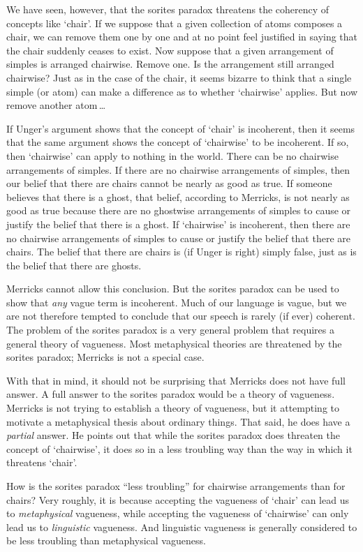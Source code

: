 \documentclass[11pt]{article}
\begin{document}
\begin{spacing}{1.5}
We have seen, however, that the sorites paradox threatens the
coherency of concepts like `chair'.  If we suppose that a given
collection of atoms composes a chair, we can remove them one by one
and at no point feel justified in saying that the chair suddenly
ceases to exist.  Now suppose that a given arrangement of simples is
arranged chairwise.  Remove one.  Is the arrangement still arranged
chairwise?  Just as in the case of the chair, it seems bizarre to
think that a single simple (or atom) can make a difference as to
whether `chairwise' applies.  But now remove another atom\,\ldots

If Unger's argument shows that the concept of `chair' is incoherent,
then it seems that the same argument shows the concept of `chairwise'
to be incoherent.  If so, then `chairwise' can apply to nothing in the
world.  There can be no chairwise arrangements of simples.  If there
are no chairwise arrangements of simples, then our belief that there
are chairs cannot be nearly as good as true.  If someone believes that
there is a ghost, that belief, according to Merricks, is not nearly as
good as true because there are no ghostwise arrangements of simples to
cause or justify the belief that there is a ghost.  If `chairwise' is
incoherent, then there are no chairwise arrangements of simples to
cause or justify the belief that there are chairs.  The belief that
there are chairs is (if Unger is right) simply false, just as is the
belief that there are ghosts.

Merricks cannot allow this conclusion.  But the sorites paradox can be
used to show that {\em any} vague term is incoherent.  Much of our
language is vague, but we are not therefore tempted to conclude that
our speech is rarely (if ever) coherent.  The problem of the sorites
paradox is a very general problem that requires a general theory of
vagueness.  Most metaphysical theories are threatened by the sorites
paradox; Merricks is not a special case.

With that in mind, it should not be surprising that Merricks does not
have full answer.  A full answer to the sorites paradox would be a
theory of vagueness.  Merricks is not trying to establish a theory of
vagueness, but it attempting to motivate a metaphysical thesis about
ordinary things.  That said, he does have a {\em partial} answer.  He
points out that while the sorites paradox does threaten the concept of
`chairwise', it does so in a less troubling way than the way in which
it threatens `chair'.  

How is the sorites paradox ``less troubling'' for chairwise
arrangements than for chairs?  Very roughly, it is because accepting
the vagueness of `chair' can lead us to {\em metaphysical} vagueness,
while accepting the vagueness of `chairwise' can only lead us to {\em
  linguistic} vagueness.  And linguistic vagueness is generally
considered to be less troubling than metaphysical vagueness.


\end{spacing}
\end{document}
